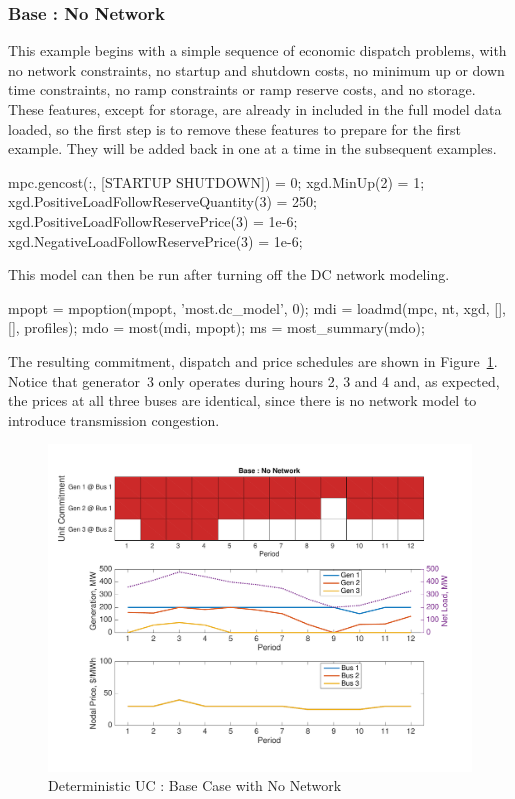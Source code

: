 \documentclass[12pt]{article}
\numberwithin{equation}{section}
\numberwithin{table}{section}
\numberwithin{figure}{section}
\begin{document}
\subsubsection*{Base : No Network}
This example begins with a simple sequence of economic dispatch problems, with no network constraints, no startup and shutdown costs, no minimum up or down time constraints, no ramp constraints or ramp reserve costs, and no storage. These features, except for storage, are already in included in the full model data loaded, so the first step is to remove these features to prepare for the first example. They will be added back in one at a time in the subsequent examples.
\begin{Code}
mpc.gencost(:, [STARTUP SHUTDOWN]) = 0; %
xgd.MinUp(2) = 1;                       %
xgd.PositiveLoadFollowReserveQuantity(3) = 250; %
xgd.PositiveLoadFollowReservePrice(3) = 1e-6;   %
xgd.NegativeLoadFollowReservePrice(3) = 1e-6;
\end{Code}
This model can then be run after turning off the DC network modeling. 
\begin{Code}
mpopt = mpoption(mpopt, 'most.dc_model', 0);    %
mdi = loadmd(mpc, nt, xgd, [], [], profiles);
mdo = most(mdi, mpopt);
ms = most_summary(mdo);     %
\end{Code}
The resulting commitment, dispatch and price schedules are shown in Figure~\ref{fig:uc_ex_1}. Notice that generator~3 only operates during hours 2, 3 and 4 and, as expected, the prices at all three buses are identical, since there is no network model to introduce transmission congestion.
\begin{figure}[hbtp]
  \centering
  \includegraphics[width=\textwidth]{./figures/uc-ex-1}
  \caption{Deterministic UC : Base Case with No Network}
  \label{fig:uc_ex_1}
\end{figure}
\end{document}
